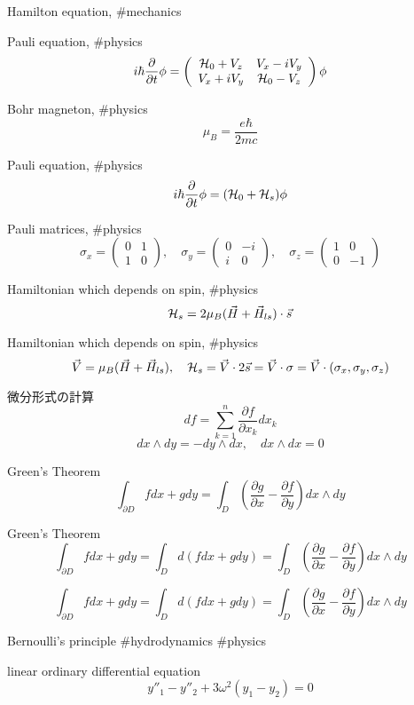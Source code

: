 Hamilton equation, #mechanics

Pauli equation, #physics
$$
i \hbar \frac{\partial}{\partial t} \phi=
\left(
\begin{array}{cc}
{\cal H}_0+V_z & V_x-i V_y \\
V_x+i V_y & {\cal H}_0-V_z
\end{array}
\right) \phi
$$

Bohr magneton, #physics
$$
\mu_B=\frac{e \hbar}{2mc}
$$

Pauli equation, #physics
$$
i\hbar\frac{\partial}{\partial t}\phi=({\cal H}_0+{\cal H}_s)\phi
$$

Pauli matrices, #physics
$$
\sigma_x=\left(\begin{array}{cc} 0 & 1 \\ 1 & 0 \end{array}\right), \quad \sigma_y=\left(\begin{array}{cc} 0 & -i \\ i & 0 \end{array}\right), \quad \sigma_z=\left(\begin{array}{cc} 1 & 0 \\ 0 & -1 \end{array}\right)
$$

Hamiltonian which depends on spin, #physics
$$
{\cal H}_s=2\mu_B({\vec H}+{\vec H}_{ls})\cdot {\vec s}
$$

Hamiltonian which depends on spin, #physics
$$
{\vec V}=\mu_B({\vec H}+{\vec H}_{ls}), \quad {\cal H}_s={\vec V}\cdot 2{\vec s}={\vec V}\cdot {\sigma}={\vec V}\cdot(\sigma_x,\sigma_y,\sigma_z)
$$

微分形式の計算
$$
df=\sum^n_{k=1}\frac{\partial f}{\partial x_k}dx_k
$$
$$
dx \wedge dy=-dy \wedge dx, \quad dx \wedge dx=0
$$

Green's Theorem
$$
\int_{\partial D}f dx+g dy=\int_D\left(\frac{\partial g}{\partial x}-\frac{\partial f}{\partial y}\right)dx \wedge dy
$$

Green's Theorem
$$
\int_{\partial D}f dx+g dy=\int_D d\left(f dx+g dy\right)=\int_D\left(\frac{\partial g}{\partial x}-\frac{\partial f}{\partial y}\right)dx \wedge dy
$$

$$
\int_{\partial D}f dx+g dy=\int_D d\left(f dx+g dy\right)=\int_D\left(\frac{\partial g}{\partial x}-\frac{\partial f}{\partial y}\right)dx \wedge dy
$$

Bernoulli's principle #hydrodynamics #physics

linear ordinary differential equation
$$
y''_1-y''_2+3\omega^2(y_1-y_2)=0
$$

